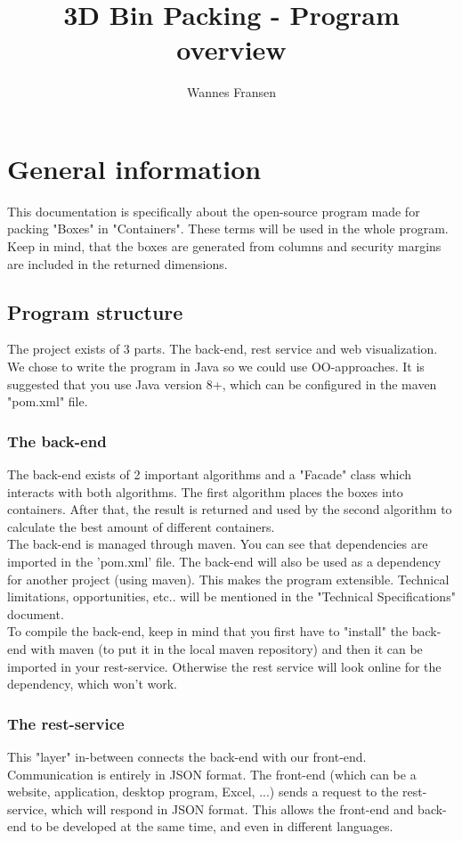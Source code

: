 \documentclass[a4paper,12pt]{article}
\begin{document}
\author{Wannes Fransen}
\title{3D Bin Packing - Program overview}

\section{General information}
This documentation is specifically about the open-source program made for packing "Boxes" in "Containers". These terms will be used in the whole program. Keep in mind, that the boxes are generated from columns and security margins are included in the returned dimensions. 

\subsection{Program structure}

The project exists of 3 parts. The back-end, rest service and web visualization.
We chose to write the program in Java so we could use OO-approaches. It is suggested that you use Java version 8+, which can be configured in the maven "pom.xml" file.

\subsubsection{The back-end}
The back-end exists of 2 important algorithms and a "Facade" class which interacts with both algorithms. The first algorithm places the boxes into containers. After that, the result is returned and used by the second algorithm to calculate the best amount of different containers.\\

The back-end is managed through maven. You can see that dependencies are imported in the 'pom.xml' file. The back-end will also be used as a dependency for another project (using maven). This makes the program extensible. Technical limitations, opportunities, etc.. will be mentioned in the "Technical Specifications" document.\\

To compile the back-end, keep in mind that you first have to "install" the back-end with maven (to put it in the local maven repository) and then it can be imported in your rest-service. Otherwise the rest service will look online for the dependency, which won't work.

\subsubsection{The rest-service}
This "layer" in-between connects the back-end with our front-end. Communication is entirely in JSON format. The front-end (which can be a website, application, desktop program, Excel, ...) sends a request to the rest-service, which will respond in JSON format. This allows the front-end and back-end to be developed at the same time, and even in different languages. \\
\end{document}
